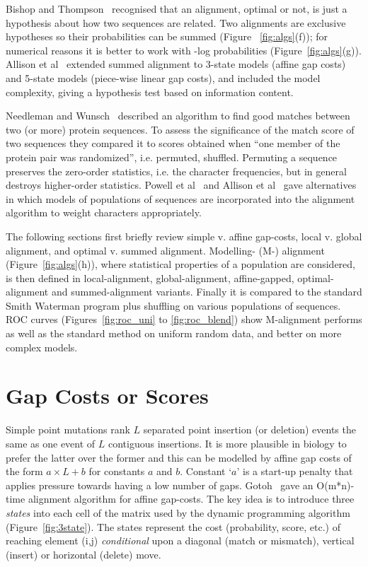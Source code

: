 \documentclass[a4paper,11pt,oneside]{article}
\begin{document}
Bishop and Thompson~\cite{bishop86} recognised that an alignment, optimal or not,
is just a hypothesis about how two sequences are related.
Two alignments are exclusive hypotheses so their probabilities
can be summed (Figure ~\ref{fig:algs}(f));
for numerical reasons it is better to work with -log probabilities (Figure~\ref{fig:algs}(g)).
Allison et al~\cite{allison92a} extended summed alignment to
3-state models (affine gap costs) and
5-state models (piece-wise linear gap costs),
and included the model complexity,
giving a hypothesis test based on information content.

Needleman and Wunsch~\cite{needleman70} described an algorithm to find good matches between
two (or more) protein sequences.
To assess the significance of the match score of two sequences
they compared it to scores obtained
when ``one member of the protein pair was randomized'', i.e. permuted, shuffled.
Permuting a sequence preserves the zero-order statistics,
i.e. the character frequencies, but
in general destroys higher-order statistics.
Powell et al~\cite{powell98b} and Allison et al~\cite{allison99} gave alternatives in which models
of populations of sequences are incorporated into the alignment algorithm
to weight characters appropriately.

The following sections first briefly review
simple v. affine gap-costs,
local v. global alignment, and
optimal v. summed alignment.
Modelling- (M-) alignment (Figure~\ref{fig:algs}(h)), where statistical properties of a
population are considered, is then defined in
local-alignment, global-alignment, affine-gapped, optimal-alignment and summed-alignment variants.
Finally it is compared to the standard Smith Waterman program plus shuffling
on various populations of sequences.
ROC curves (Figures~\ref{fig:roc_uni} to \ref{fig:roc_blend})
show M-alignment performs as well as the standard method on uniform 
random data, and better on more complex models.




\section{Gap Costs or Scores}

Simple point mutations rank $L$ separated point insertion (or deletion) events
the same as one event of $L$ contiguous insertions.
It is more plausible in biology to prefer the latter over the former and
this can be modelled by affine gap costs of the form $a \times L+b$ for
constants $a$ and $b$.
Constant `$a$' is a start-up penalty that applies pressure towards having
a low number of gaps.
Gotoh~\cite{gotoh82} gave an O(m*n)-time alignment algorithm for affine gap-costs.
The key idea is to introduce three {\em states} into  each cell of
the matrix used by the dynamic programming algorithm (Figure~\ref{fig:3state}).
The states represent the cost (probability, score, etc.) of reaching
element (i,j) {\em conditional} upon a
diagonal (match or mismatch), vertical (insert) or horizontal (delete) move.
\end{document}
